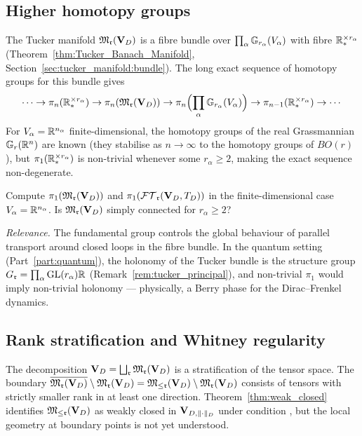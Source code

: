\subsection*{Higher homotopy groups}

The Tucker manifold $\mathfrak{M}_{\mathfrak{r}}(\mathbf{V}_D)$ is a fibre bundle over
$\prod_\alpha \mathbb{G}_{r_\alpha}(V_\alpha)$ with fibre
$\mathbb{R}^{\times r_\alpha}_*$
(Theorem~\ref{thm:Tucker_Banach_Manifold}, Section~\ref{sec:tucker_manifold:bundle}).
The long exact sequence of homotopy groups for this bundle gives
\begin{equation*}
    \cdots \to \pi_n(\mathbb{R}^{\times r_\alpha}_*) \to
    \pi_n(\mathfrak{M}_{\mathfrak{r}}(\mathbf{V}_D)) \to
    \pi_n\Bigl(\prod_\alpha \mathbb{G}_{r_\alpha}(V_\alpha)\Bigr) \to
    \pi_{n-1}(\mathbb{R}^{\times r_\alpha}_*) \to \cdots
\end{equation*}
For $V_\alpha = \mathbb{R}^{n_\alpha}$ finite-dimensional, the homotopy groups
of the real Grassmannian $\mathbb{G}_{r}(\mathbb{R}^n)$ are known
(they stabilise as $n \to \infty$ to the homotopy groups of $BO(r)$),
but $\pi_1(\mathbb{R}^{\times r_\alpha}_*)$ is non-trivial whenever some
$r_\alpha \geq 2$, making the exact sequence non-degenerate.

\begin{problem}
\label{prob:homotopy}
Compute $\pi_1(\mathfrak{M}_{\mathfrak{r}}(\mathbf{V}_D))$ and $\pi_1(\mathcal{FT}_{\mathfrak{r}}(\mathbf{V}_D,T_D))$ in the
finite-dimensional case $V_\alpha = \mathbb{R}^{n_\alpha}$. Is
$\mathfrak{M}_{\mathfrak{r}}(\mathbf{V}_D)$ simply connected for $r_\alpha \geq 2$?

\emph{Relevance.} The fundamental group controls the global
behaviour of parallel transport around closed loops in the fibre
bundle. In the quantum setting (Part~\ref{part:quantum}), the holonomy
of the Tucker bundle is the structure group $G_{\mathfrak{r}} = \prod_\alpha
\mathrm{GL}(r_\alpha){\mathbb{R}}$ (Remark~\ref{rem:tucker_principal}), and
non-trivial $\pi_1$ would imply non-trivial holonomy — physically,
a Berry phase for the Dirac--Frenkel dynamics.
\end{problem}

\subsection*{Rank stratification and Whitney regularity}

The decomposition $\mathbf{V}_D = \bigsqcup_{\mathfrak{r}} \mathfrak{M}_{\mathfrak{r}}(\mathbf{V}_D)$ is a
stratification of the tensor space. The boundary
$\overline{\mathfrak{M}_{\mathfrak{r}}(\mathbf{V}_D)} \setminus \mathfrak{M}_{\mathfrak{r}}(\mathbf{V}_D)
= \mathfrak{M}_{\leq\mathfrak{r}}(\mathbf{V}_D) \setminus \mathfrak{M}_{\mathfrak{r}}(\mathbf{V}_D)$
consists of tensors with strictly smaller rank in at least one direction.
Theorem~\ref{thm:weak_closed} identifies $\mathfrak{M}_{\leq\mathfrak{r}}(\mathbf{V}_D)$ as
weakly closed in $\mathbf{V}_{D,\|\cdot\|_D}$ under condition \condINJ, but the local
geometry at boundary points is not yet understood.

